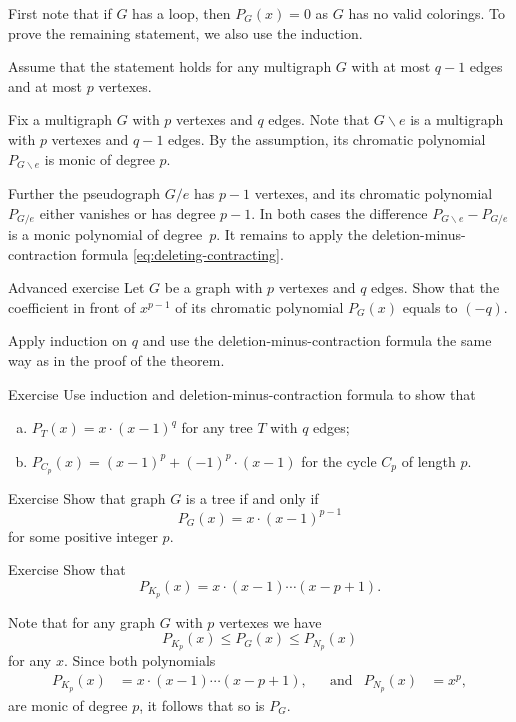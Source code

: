 First note that if $G$ has a loop, then $P_G(x)=0$ as $G$ has no valid colorings.
To prove the remaining statement, we also use the induction.

Assume that the statement holds for any multigraph $G$ with at most $q-1$ edges and at most $p$ vertexes.

Fix a multigraph $G$ with $p$ vertexes and $q$ edges.
Note that $G\backslash e$ is a multigraph with $p$ vertexes and $q-1$ edges.
By the assumption, its chromatic polynomial $P_{G\backslash e}$ is monic of degree $p$.

Further the pseudograph $G/e$ has $p-1$ vertexes,
and its chromatic polynomial $P_{G/e}$ either vanishes or has degree $p-1$.
In both cases the difference $P_{G\backslash e}-P_{G/e}$ is a monic polynomial of degree~$p$.
It remains to apply the deletion-minus-contraction formula \ref{eq:deleting-contracting}.
\qeds

\begin{thm}{Advanced exercise}
Let $G$ be a graph with $p$ vertexes and $q$ edges.
Show that the coefficient in front of $x^{p-1}$ of its chromatic polynomial $P_G(x)$ equals to $(-q)$.
\end{thm}

 Apply induction on $q$ and use the deletion-minus-contraction formula the same way as in the proof of the theorem.

\begin{thm}{Exercise}
Use induction and  deletion-minus-contraction formula to show that 
\begin{enumerate}[(a)]
\item $P_{T}(x)=x\cdot(x-1)^q$ for any tree $T$ with $q$ edges;
\item $P_{C_p}(x)=(x-1)^p+(-1)^p\cdot(x-1)$ for the cycle $C_p$ of length $p$.
\end{enumerate}
\end{thm}


\begin{thm}{Exercise} Show that graph $G$ is a tree if and only if \[P_G(x)= x\cdot(x-1)^{p-1}\] for some positive integer $p$.
\end{thm}

\begin{thm}{Exercise}\label{ex:chrom(K_p)}
Show that 
\[P_{K_p}(x)=x\cdot(x-1)\cdots(x-p+1).\]

\end{thm}

Note that for any graph $G$ with $p$ vertexes we have
\[P_{K_p}(x)\le P_G(x)\le P_{N_p}(x)\]
for any $x$.
Since both polynomials
\begin{align*}
P_{K_p}(x)&=x\cdot(x-1)\cdots(x-p+1),&&
\text{and}
&
P_{N_p}(x)&=x^p,
\end{align*}
are monic of degree $p$,
it follows that so is $P_G$.

